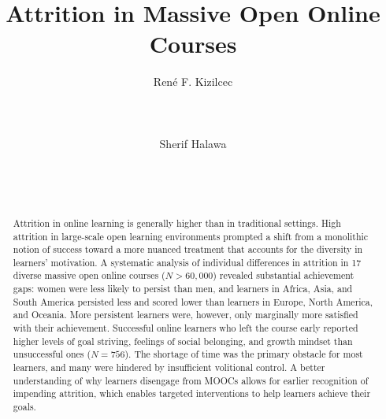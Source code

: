 \documentclass{sigchi}\usepackage[]{graphicx}\usepackage[]{color}
\begin{document}
\title{Attrition in Massive Open Online Courses}

\author{
  \alignauthor Ren\'{e} F. Kizilcec\\
    \\
    \\
    \\
  \alignauthor Sherif Halawa\\
    \\
    \\
    \\
}

\maketitle

\begin{abstract}
Attrition in online learning is generally higher than in traditional settings. High attrition in large-scale open learning environments prompted a shift from a monolithic notion of success toward a more nuanced treatment that accounts for the diversity in learners' motivation.
A systematic analysis of individual differences in attrition in 17 diverse massive open online courses ($N>60,000$) revealed substantial achievement gaps: women were less likely to persist than men, and learners in Africa, Asia, and South America persisted less and scored lower than learners in Europe, North America, and Oceania. More persistent learners were, however, only marginally more satisfied with their achievement. 
Successful online learners who left the course early reported higher levels of goal striving, feelings of social belonging, and growth mindset than unsuccessful ones ($N=756$). The shortage of time was the primary obstacle for most learners, and many were hindered by insufficient volitional control.
A better understanding of why learners disengage from MOOCs allows for earlier recognition of impending attrition, which enables targeted interventions to help learners achieve their goals.
\end{abstract}


\end{document}
